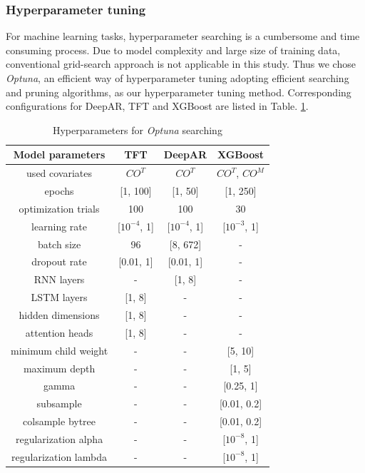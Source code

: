 \subsubsection{Hyperparameter tuning}

For machine learning tasks, hyperparameter searching is a cumbersome and time consuming process. Due to model complexity and large size of training data, conventional grid-search approach is not applicable in this study. Thus we chose \textit{Optuna}, an efficient way of hyperparameter tuning adopting efficient searching and pruning algorithms\cite{optuna_2019}, as our hyperparameter tuning method. Corresponding configurations for DeepAR, TFT and XGBoost are listed in Table. \ref{tab:Optuna}.

\begin{table}\centering
\renewcommand\arraystretch{1} %
\setlength{\abovecaptionskip}{10pt}
\setlength{\belowcaptionskip}{-10pt}
\begin{tabular}{cccc}
   \toprule
   Model parameters & TFT & DeepAR & XGBoost   \\
   \midrule
   used covariates & $CO^T$ & $CO^T$ & $CO^T$, $CO^M$  \\ 
   epochs & [1, 100] & [1, 50] & [1, 250]   \\
   optimization trials & 100 & 100 & 30   \\
   learning rate & [$10^{-4}$, 1] & [$10^{-4}$, 1] & [$10^{-3}$, 1] \\
   batch size & 96 & [8, 672] & - \\
   dropout rate & [0.01, 1] & [0.01, 1] & - \\
   \midrule
   RNN layers & - & [1, 8] & - \\
   \midrule
   LSTM layers & [1, 8] & - & - \\
   hidden dimensions & [1, 8] & - & - \\
   attention heads & [1, 8] & - & - \\
   \midrule
   minimum child weight & - & - & [5, 10] \\
    maximum depth& -& -&[1, 5]\\
    gamma& -& -&[0.25, 1]\\
    subsample  & -& -&[0.01, 0.2]\\
    colsample bytree& -& -&[0.01, 0.2]\\
    regularization alpha& -& -&[$10^{-8}$, 1]\\
    regularization lambda& -& -&[$10^{-8}$, 1]\\
    \bottomrule
\end{tabular}
\caption{Hyperparameters for \emph{Optuna} searching}\centering
    \label{tab:Optuna}
\end{table}


